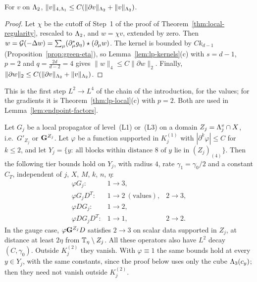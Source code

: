 \begin{lemma}\label{lem:local-sobolev}
For $v$ on $\Lambda_2$, $\|v\|_{4,\Lambda_1}\le C(\|\partial v\|_{\Lambda_2}+\|v\|_{\Lambda_2})$.
\end{lemma}

\begin{proof}
Let $\chi$ be the cutoff of Step~1 of the proof of Theorem~\ref{thm:local-regularity}, rescaled to $\Lambda_2$, and $w=\chi v$, extended by zero. Then $w=\mathcal G(-\Delta w)=\sum_\mu(\partial^*_\mu g_\eta)\star(\partial_\mu w)$. The kernel is bounded by $Ck_{d-1}$ (Proposition~\ref{prop:green-eta}), so Lemma~\ref{lem:lp-kernels}(c) with $s=d-1$, $p=2$ and $q=\frac{2d}{d-2}=4$ gives $\|w\|_4\le C\|\partial w\|_2$. Finally, $\|\partial w\|_2\le C(\|\partial v\|_{\Lambda_2}+\|v\|_{\Lambda_2})$.
\end{proof}

This is the first step $L^2\to L^4$ of the chain of the introduction, for the values; for the gradients it is Theorem~\ref{thm:lp-local}(c) with $p=2$. Both are used in Lemma~\ref{lem:endpoint-factors}.

\begin{lemma}\label{lem:int-factors}
Let $G_j$ be a local propagator of level~(L1) or~(L3) on a domain $Z_j=\Lambda^v_j\cap X$, i.e.\ $G'_{Z_j}$ or $\mathbf G^{Z_j}$. Let $\varphi$ be a function supported in $K_j^{(1)}$ with $|\partial^k\varphi|\le C$ for $k\le2$, and let $Y_j=\{y:\ \text{all blocks within distance }8\text{ of }y\text{ lie in }(Z_j)_{(4)}\}$. Then the following tier bounds hold on $Y_j$, with radius $4$, rate $\gamma_1=\gamma_0/2$ and a constant $C_T$, independent of $j$, $X$, $M$, $k$, $n$, $\eta$:
\[
\begin{array}{lll}
\varphi G_j: & 1\to3,\\
\varphi G_jD^T: & 1\to2\ (\text{values}), & 2\to3,\\
\varphi DG_j: & 1\to2,\\
\varphi DG_jD^T: & 1\to1, & 2\to2.
\end{array}
\]
In the gauge case, $\varphi\mathbf G^{Z_j}D$ satisfies $2\to3$ on scalar data supported in $Z_j$, at distance at least $2\eta$ from $\mathbb T_\eta\setminus Z_j$. All these operators also have $L^2$ decay $(C,\gamma_0)$. Outside $K_j^{(2)}$ they vanish. With $\varphi\equiv1$ the same bounds hold at every $y\in Y_j$, with the same constants, since the proof below uses only the cube $\Lambda_3(c_y)$; then they need not vanish outside $K_j^{(2)}$.
\end{lemma}

